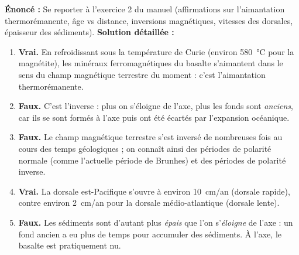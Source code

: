 \documentclass[11pt]{article}
\begin{document}
\begin{corrige}
\textbf{Énoncé :} Se reporter à l'exercice 2 du manuel (affirmations sur l'aimantation thermorémanente, âge vs distance, inversions magnétiques, vitesses des dorsales, épaisseur des sédiments).
\tcblower
\textbf{Solution détaillée :}
\begin{enumerate}
\item \textbf{Vrai.} En refroidissant sous la température de Curie (environ \SI{580}{\celsius} pour la magnétite), les minéraux ferromagnétiques du basalte s'aimantent dans le sens du champ magnétique terrestre du moment : c'est l'aimantation thermorémanente.
\item \textbf{Faux.} C'est l'inverse : plus on s'éloigne de l'axe, plus les fonds sont \emph{anciens}, car ils se sont formés à l'axe puis ont été écartés par l'expansion océanique.
\item \textbf{Faux.} Le champ magnétique terrestre s'est inversé de nombreuses fois au cours des temps géologiques ; on connaît ainsi des périodes de polarité normale (comme l'actuelle période de Brunhes) et des périodes de polarité inverse.
\item \textbf{Vrai.} La dorsale est-Pacifique s'ouvre à environ \SI{10}{cm/an} (dorsale rapide), contre environ \SI{2}{cm/an} pour la dorsale médio-atlantique (dorsale lente).
\item \textbf{Faux.} Les sédiments sont d'autant plus \emph{épais} que l'on s'\emph{éloigne} de l'axe : un fond ancien a eu plus de temps pour accumuler des sédiments. À l'axe, le basalte est pratiquement nu.
\end{enumerate}
\end{corrige}
\end{document}
